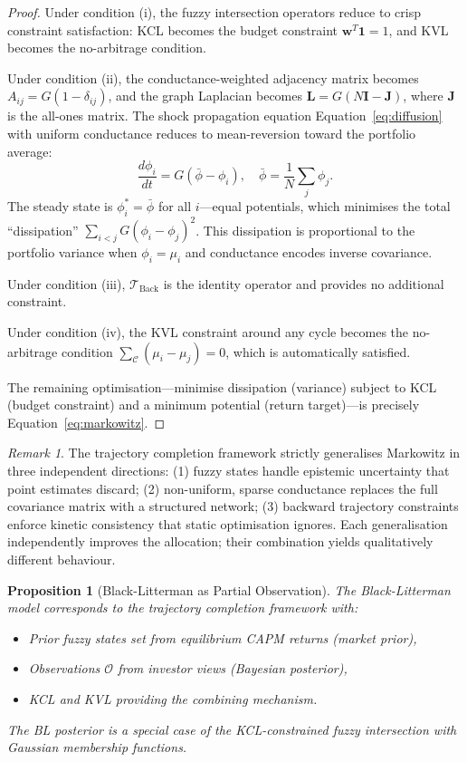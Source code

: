 \documentclass[twocolumn,10pt]{article}
\newtheorem{proposition}[theorem]{Proposition}
\theoremstyle{remark}
\newtheorem{remark}[theorem]{Remark}
\newcommand{\Tback}{\mathcal{T}_{\mathrm{Back}}}
\newcommand{\eqnref}[1]{Equation~\ref{#1}}
\begin{document}
\begin{proof}
Under condition (i), the fuzzy intersection operators reduce to crisp constraint satisfaction: KCL becomes the budget constraint $\mathbf{w}^T \mathbf{1} = 1$, and KVL becomes the no-arbitrage condition.

Under condition (ii), the conductance-weighted adjacency matrix becomes $A_{ij} = G(1 - \delta_{ij})$, and the graph Laplacian becomes $\mathbf{L} = G(N\mathbf{I} - \mathbf{J})$, where $\mathbf{J}$ is the all-ones matrix.  The shock propagation equation \eqnref{eq:diffusion} with uniform conductance reduces to mean-reversion toward the portfolio average:
\begin{equation}
    \frac{d\phi_i}{dt} = G\!\left(\bar{\phi} - \phi_i\right), \quad \bar{\phi} = \frac{1}{N}\sum_j \phi_j.
\end{equation}
The steady state is $\phi_i^* = \bar{\phi}$ for all $i$---equal potentials, which minimises the total ``dissipation'' $\sum_{i<j} G(\phi_i - \phi_j)^2$.  This dissipation is proportional to the portfolio variance when $\phi_i = \mu_i$ and conductance encodes inverse covariance.

Under condition (iii), $\Tback$ is the identity operator and provides no additional constraint.

Under condition (iv), the KVL constraint around any cycle becomes the no-arbitrage condition $\sum_{\mathcal{C}} (\mu_i - \mu_j) = 0$, which is automatically satisfied.

The remaining optimisation---minimise dissipation (variance) subject to KCL (budget constraint) and a minimum potential (return target)---is precisely \eqnref{eq:markowitz}.
\end{proof}

\begin{remark}
The trajectory completion framework strictly generalises Markowitz in three independent directions: (1) fuzzy states handle epistemic uncertainty that point estimates discard; (2) non-uniform, sparse conductance replaces the full covariance matrix with a structured network; (3) backward trajectory constraints enforce kinetic consistency that static optimisation ignores.  Each generalisation independently improves the allocation; their combination yields qualitatively different behaviour.
\end{remark}

\begin{proposition}[Black-Litterman as Partial Observation]
\label{prop:BL}
The Black-Litterman model \cite{black1992} corresponds to the trajectory completion framework with:
\begin{itemize}
    \item Prior fuzzy states set from equilibrium CAPM returns (market prior),
    \item Observations $\mathcal{O}$ from investor views (Bayesian posterior),
    \item KCL and KVL providing the combining mechanism.
\end{itemize}
The BL posterior is a special case of the KCL-constrained fuzzy intersection with Gaussian membership functions.
\end{proposition}
\end{document}
